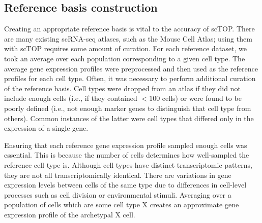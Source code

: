 \documentclass[aps,superscriptaddress, notitlepage,longbibliography]{revtex4-1}
\begin{document}
\subsection{Reference basis construction}\label{basis construction}
Creating an appropriate reference basis is vital to the accuracy of scTOP. There are many existing scRNA-seq atlases, such as the Mouse Cell Atlas; using them with scTOP requires some amount of curation. For each reference dataset, we took an average over each population corresponding to a given cell type. The average gene expression profiles were preprocessed and then used as the reference profiles for each cell type. Often, it was necessary to perform additional curation of the reference basis. Cell types were dropped from an atlas if they did not include enough cells (i.e., if they contained $<100$ cells) or were found to be poorly defined (i.e., not enough marker genes to distinguish that cell type from others). Common instances of the latter were cell types that differed only in the expression of a single gene.

Ensuring that each reference gene expression profile sampled enough cells was essential. This is because the number of cells determines how well-sampled the reference cell type is. Although cell types have distinct transcriptomic patterns, they are not all transcriptomically identical. There are variations in gene expression levels between cells of the same type due to differences in cell-level processes such as cell division or environmental stimuli. Averaging over a population of cells which are some cell type X creates an approximate gene expression profile of the archetypal X cell. 
\end{document}
